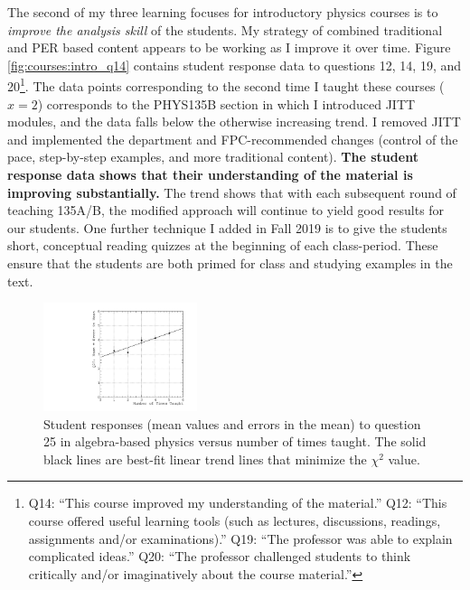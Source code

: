 \documentclass[../../main.tex]{subfiles}
\begin{document}
The second of my three learning focuses for introductory physics courses is to \textit{improve the analysis skill} of the students.  My strategy of combined traditional and PER based content appears to be working as I improve it over time.  Figure \ref{fig:courses:intro_q14} contains student response data to questions 12, 14, 19, and 20\footnote{Q14: ``This course improved my understanding of the material.'' Q12: ``This course offered useful learning tools (such as lectures, discussions, readings, assignments and/or examinations).'' Q19: ``The professor was able to explain complicated ideas.'' Q20: ``The professor challenged students to think critically and/or imaginatively about the course material.''}.  The data points corresponding to the second time I taught these courses ($x = 2$) corresponds to the PHYS135B section in which I introduced JITT modules, and the data falls below the otherwise increasing trend.  I removed JITT and implemented the department and FPC-recommended changes (control of the pace, step-by-step examples, and more traditional content).  \textbf{The student response data shows that their understanding of the material is improving substantially.}  The trend shows that with each subsequent round of teaching 135A/B, the modified approach  will continue to yield good results for our students.  One further technique I added in Fall 2019 is to give the students short, conceptual reading quizzes at the beginning of each class-period.  These ensure that the students are both primed for class and studying examples in the text.  \\ \hspace{0.1cm}

\begin{figure}
\centering
\includegraphics[width=0.4\textwidth]{Q25_algebra_based.pdf}
\caption{\label{fig:courses:intro_q25}  Student responses (mean values and errors in the mean) to question 25 in algebra-based physics versus number of times taught.  The solid black lines are best-fit linear trend lines that minimize the $\chi^2$ value.}
\end{figure}
\end{document}
